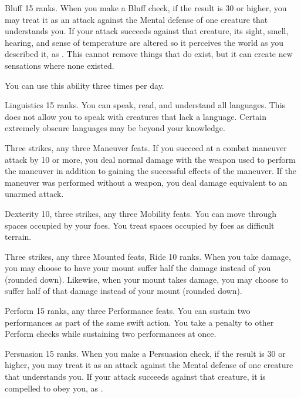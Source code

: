 \featpre Bluff 15 ranks.
\featben When you make a Bluff check, if the result is 30 or higher, you may treat it as an attack against the Mental defense of one creature that understands you.
If your attack succeeds against that creature, its sight, smell, hearing, and sense of temperature are altered so it perceives the world as you described it, as .
This cannot remove things that do exist, but it can create new sensations where none existed.

You can use this ability three times per day.

\featpre Linguistics 15 ranks.
\featben You can speak, read, and understand all languages.
This does not allow you to speak with creatures that lack a language.
Certain extremely obscure languages may be beyond your knowledge.

\featpres Three strikes, any three Maneuver feats.
\featben If you succeed at a combat maneuver attack by 10 or more, you deal normal damage with the weapon used to perform the maneuver in addition to gaining the successful effects of the maneuver.
If the maneuver was performed without a weapon, you deal damage equivalent to an unarmed attack.

\featpres Dexterity 10, three strikes, any three Mobility feats.
\featben You can move through spaces occupied by your foes.
You treat spaces occupied by foes as difficult terrain.

\featpres Three strikes, any three Mounted feats, Ride 10 ranks.
\featben When you take damage, you may choose to have your mount suffer half the damage instead of you (rounded down).
Likewise, when your mount takes damage, you may choose to suffer half of that damage instead of your mount (rounded down).

\featpres Perform 15 ranks, any three Performance feats.
\featben You can sustain two performances as part of the same swift action.
You take a  penalty to other Perform checks while sustaining two performances at once.

\featpre Persuasion 15 ranks.
\featben When you make a Persuasion check, if the result is 30 or higher, you may treat it as an attack against the Mental defense of one creature that understands you.
If your attack succeeds against that creature, it is compelled to obey you, as .

